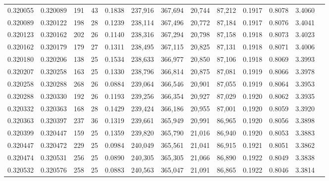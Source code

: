 \begin{tabular}{rrrrrrrrrrrrr}
0.320055 & 0.320089 &   191 &  43 &                                     0.1838 & 237,916 & 367,694 &  20,744 &  87,212 & 0.1917 & 0.8078 & 3.4060 \\
0.320089 & 0.320122 &   198 &  28 &                                     0.1239 & 238,114 & 367,496 &  20,772 &  87,184 & 0.1917 & 0.8076 & 3.4041 \\
0.320123 & 0.320162 &   202 &  26 &                                     0.1140 & 238,316 & 367,294 &  20,798 &  87,158 & 0.1918 & 0.8073 & 3.4023 \\
0.320162 & 0.320179 &   179 &  27 &                                     0.1311 & 238,495 & 367,115 &  20,825 &  87,131 & 0.1918 & 0.8071 & 3.4006 \\
0.320180 & 0.320206 &   138 &  25 &                                     0.1534 & 238,633 & 366,977 &  20,850 &  87,106 & 0.1918 & 0.8069 & 3.3993 \\
0.320207 & 0.320258 &   163 &  25 &                                     0.1330 & 238,796 & 366,814 &  20,875 &  87,081 & 0.1919 & 0.8066 & 3.3978 \\
0.320258 & 0.320288 &   268 &  26 &                                     0.0884 & 239,064 & 366,546 &  20,901 &  87,055 & 0.1919 & 0.8064 & 3.3953 \\
0.320288 & 0.320330 &   192 &  26 &                                     0.1193 & 239,256 & 366,354 &  20,927 &  87,029 & 0.1920 & 0.8062 & 3.3935 \\
0.320332 & 0.320363 &   168 &  28 &                                     0.1429 & 239,424 & 366,186 &  20,955 &  87,001 & 0.1920 & 0.8059 & 3.3920 \\
0.320363 & 0.320397 &   237 &  36 &                                     0.1319 & 239,661 & 365,949 &  20,991 &  86,965 & 0.1920 & 0.8056 & 3.3898 \\
0.320399 & 0.320447 &   159 &  25 &                                     0.1359 & 239,820 & 365,790 &  21,016 &  86,940 & 0.1920 & 0.8053 & 3.3883 \\
0.320447 & 0.320472 &   229 &  25 &                                     0.0984 & 240,049 & 365,561 &  21,041 &  86,915 & 0.1921 & 0.8051 & 3.3862 \\
0.320474 & 0.320531 &   256 &  25 &                                     0.0890 & 240,305 & 365,305 &  21,066 &  86,890 & 0.1922 & 0.8049 & 3.3838 \\
0.320532 & 0.320576 &   258 &  25 &                                     0.0883 & 240,563 & 365,047 &  21,091 &  86,865 & 0.1922 & 0.8046 & 3.3814 \\

\end{tabular}
